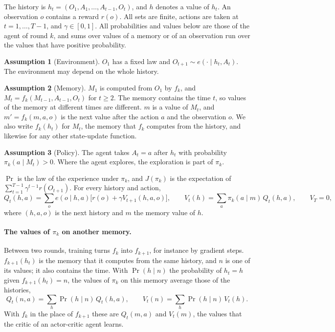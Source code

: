 \documentclass[11pt]{article}
\theoremstyle{definition}
\newtheorem{assumption}{Assumption}
\begin{document}
The history is $h_t=(O_1,A_1,\dots,A_{t-1},O_t)$, and $h$ denotes a value of $h_t$. An observation $o$ contains a reward $r(o)$. All sets are finite, actions are taken at $t=1,\dots,T-1$, and $\gamma\in[0,1]$. All probabilities and values below are those of the agent of round $k$, and sums over values of a memory or of an observation run over the values that have positive probability.

\begin{assumption}[Environment]\label{as:env}
$O_1$ has a fixed law and $O_{t+1}\sim e(\cdot\mid h_t,A_t)$. The environment may depend on the whole history.
\end{assumption}
\begin{assumption}[Memory]\label{as:mem}
$M_1$ is computed from $O_1$ by $f_k$, and $M_t=f_k(M_{t-1},A_{t-1},O_t)$ for $t\ge2$. The memory contains the time $t$, so values of the memory at different times are different. $m$ is a value of $M_t$, and $m'=f_k(m,a,o)$ is the next value after the action $a$ and the observation $o$. We also write $f_k(h_t)$ for $M_t$, the memory that $f_k$ computes from the history, and likewise for any other state-update function.
\end{assumption}
\begin{assumption}[Policy]\label{as:pol}
The agent takes $A_t=a$ after $h_t$ with probability $\pi_k(a\mid M_t)>0$. Where the agent explores, the exploration is part of $\pi_k$.
\end{assumption}

$\Pr$ is the law of the experience under $\pi_k$, and $J(\pi_k)$ is the expectation of $\sum_{t=1}^{T-1}\gamma^{t-1}r(O_{t+1})$. For every history and action,
\begin{equation}\label{eq:bellman}
Q_t(h,a)=\sum_oe(o\mid h,a)\big[r(o)+\gamma V_{t+1}(h,a,o)\big],\qquad V_t(h)=\sum_a\pi_k(a\mid m)\,Q_t(h,a),\qquad V_T=0,
\end{equation}
where $(h,a,o)$ is the next history and $m$ the memory value of $h$.

\paragraph{The values of $\pi_k$ on another memory.} Between two rounds, training turns $f_k$ into $f_{k+1}$, for instance by gradient steps. $f_{k+1}(h_t)$ is the memory that it computes from the same history, and $n$ is one of its values; it also contains the time. With $\Pr(h\mid n)$ the probability of $h_t=h$ given $f_{k+1}(h_t)=n$, the values of $\pi_k$ on this memory average those of the histories,
\[
Q_t(n,a)=\sum_h\Pr(h\mid n)\,Q_t(h,a),\qquad V_t(n)=\sum_h\Pr(h\mid n)\,V_t(h).
\]
With $f_k$ in the place of $f_{k+1}$ these are $Q_t(m,a)$ and $V_t(m)$, the values that the critic of an actor-critic agent learns.
\end{document}
